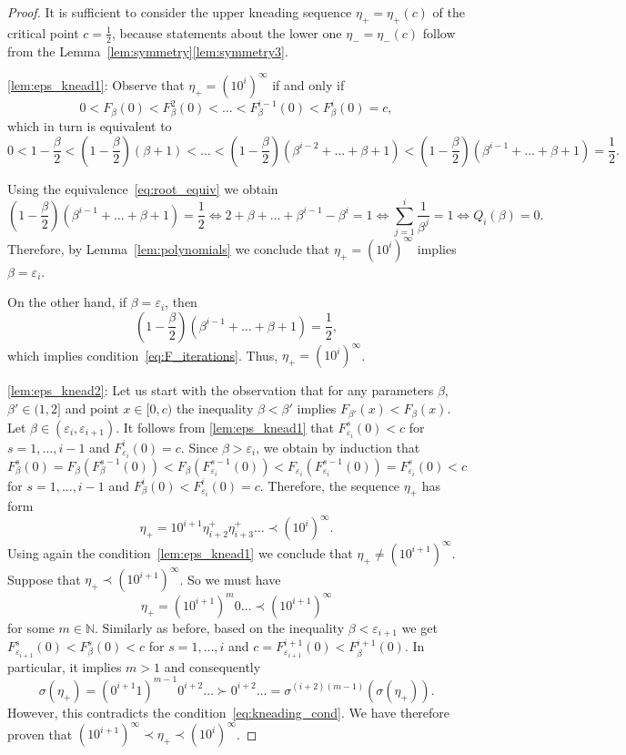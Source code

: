 \documentclass[10pt,reqno]{amsart}
\theoremstyle{plain}
\theoremstyle{assumption}
\theoremstyle{notation}
\theoremstyle{claim}
\theoremstyle{conj}
\theoremstyle{theorem}
\theoremstyle{proposition}
\theoremstyle{corollary}
\begin{document}
\begin{proof}
It is sufficient to consider the upper kneading sequence $\eta_+=\eta_+(c)$ of the critical point $c=\frac{1}{2}$, because statements about the lower one $\eta_-=\eta_-(c)$ follow from the Lemma~\ref{lem:symmetry}\eqref{lem:symmetry3}.

\eqref{lem:eps_knead1}: Observe that $\eta_+=(10^i)^\infty$ if and only if 
$$
0<F_{\beta}(0)<F_{\beta}^2(0)<\ldots<F_{\beta}^{i-1}(0)<F_{\beta}^i(0)=c,
$$
which in turn is equivalent to
\begin{equation}\label{eq:F_iterations}
0<1-\frac{\beta}{2}<\left(1-\frac{\beta}{2}\right)\left(\beta+1\right)<\ldots<\left(1-\frac{\beta}{2}\right)\left(\beta^{i-2}+\ldots+\beta+1\right)<\left(1-\frac{\beta}{2}\right)\left(\beta^{i-1}+\ldots+\beta+1\right)=\frac{1}{2}.
\end{equation}

Using the equivalence~\eqref{eq:root_equiv} we obtain
$$
\left(1-\frac{\beta}{2}\right)\left(\beta^{i-1}+\ldots+\beta+1\right)=\frac{1}{2}\iff2+\beta+\ldots+\beta^{i-1}-\beta^{i}=1\iff\sum_{j=1}^i\frac{1}{\beta^j}=1\iff Q_i(\beta)=0.
$$
Therefore, by Lemma~\ref{lem:polynomials} we conclude that $\eta_+=(10^i)^\infty$ implies $\beta=\varepsilon_i$.

On the other hand, if $\beta=\varepsilon_i$, then 
$$
\left(1-\frac{\beta}{2}\right)\left(\beta^{i-1}+\ldots+\beta+1\right)=\frac{1}{2},
$$
which implies condition~\eqref{eq:F_iterations}. Thus, $\eta_+=(10^i)^\infty$.

\eqref{lem:eps_knead2}: Let us start with the observation that for any parameters $\beta$, $\beta'\in(1,2]$ and point $x\in[0,c)$ the inequality $\beta<\beta'$ implies $F_{\beta'}(x)<F_{\beta}(x)$. Let $\beta\in(\varepsilon_i,\varepsilon_{i+1})$. It follows from \eqref{lem:eps_knead1} that $F^s_{\varepsilon_i}(0)<c$ for $s=1,\ldots,i-1$ and $F^i_{\varepsilon_i}(0)=c$. Since $\beta>\varepsilon_i$, we obtain by induction that
$$
F^s_{\beta}(0)=F_{\beta}(F^{s-1}_{\beta}(0))<F_{\beta}(F^{s-1}_{\varepsilon_i}(0))<F_{\varepsilon_i}(F^{s-1}_{\varepsilon_i}(0))=F^s_{\varepsilon_i}(0)<c
$$
for $s=1,\ldots,i-1$ and $F^i_{\beta}(0)<F^i_{\varepsilon_i}(0)=c$. Therefore, the sequence $\eta_+$ has form
$$
\eta_+=10^{i+1}\eta^+_{i+2}\eta^+_{i+3}\ldots\prec(10^i)^\infty.
$$
Using again the condition~\eqref{lem:eps_knead1} we conclude that $\eta_+\neq(10^{i+1})^\infty$. Suppose that $\eta_+\prec(10^{i+1})^\infty$. So we must have
$$
\eta_+=(10^{i+1})^m0\ldots\prec(10^{i+1})^\infty
$$
for some $m\in\mathbb{N}$. Similarly as before, based on the inequality $\beta<\varepsilon_{i+1}$ we get $F^s_{\varepsilon_{i+1}}(0)<F^s_{\beta}(0)<c$ for $s=1,\ldots,i$ and $c=F^{i+1}_{\varepsilon_{i+1}}(0)<F^{i+1}_{\beta}(0)$. In particular, it implies $m>1$ and consequently
$$
\sigma(\eta_+)=(0^{i+1}1)^{m-1}0^{i+2}\ldots\succ0^{i+2}\ldots=\sigma^{(i+2)(m-1)}(\sigma(\eta_+)).
$$
However, this contradicts the condition~\eqref{eq:kneading_cond}. We have therefore proven that $(10^{i+1})^\infty\prec\eta_+\prec(10^i)^\infty$.


\end{proof}
\end{document}
